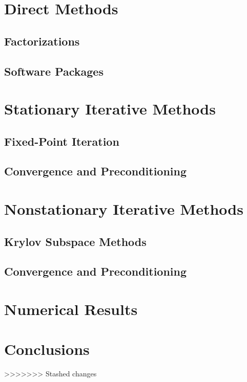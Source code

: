 \documentclass[10pt]{article}
\begin{document}
\begin{multicols}{2}
\section{Direct Methods}
\subsection{Factorizations}
\subsection{Software Packages}

\section{Stationary Iterative Methods}
\subsection{Fixed-Point Iteration}
\subsection{Convergence and Preconditioning}

\section{Nonstationary Iterative Methods}
\subsection{Krylov Subspace Methods}
\subsection{Convergence and Preconditioning}

\section{Numerical Results}

\section{Conclusions}

\nocite{*}


\end{multicols}
>>>>>>> Stashed changes
\end{document}
